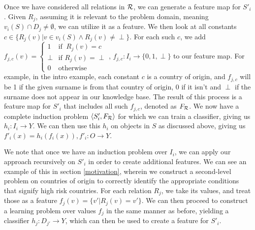 \documentclass[twoside,11pt]{article}
\theoremstyle{definition}
\begin{document}
Once we have considered all relations in ${\cal R}$, we can generate a feature map for $S'_i$. Given $R_j$, assuming it is relevant to the problem domain, meaning $v_i(S)\cap D_j\neq\emptyset$, we can utilize it as a feature. We then look at all constants $c\in \{R_j(v)|v\in v_i(S)\land R_j(v)\neq \perp\}$. For each such $c$, we add  $f_{j,c}(v)=\begin{cases} 1 &\mbox{if } \ R_j(v)=c\\
\perp &\mbox{if } R_j(v)=\perp\\
0 & \mbox{otherwise } \end{cases}$, $f_{j,c}:I_i\rightarrow \{0,1,\perp\}$ to our feature map. 
For example, in the intro example, each constant $c$ is a country of origin, and $f_{j,c}$ will be 1 if the given surname is from that country of origin, 0 if it isn't and $\perp$ if the surname does not appear in our knowledge base.
The result of this process is a feature map for $S'_i$ that includes all such $f_{j,c}$, denoted as $F_{\cal R}$. We now have a complete induction problem $\langle S'_i,F_{\cal R} \rangle$ for which we can train a classifier, giving us $h_i:I_i\rightarrow Y$. We can then use this $h_i$ on objects in $S$ as discussed above, giving us $f'_{i}(x)=h_{i}(f_{i}(x)), f'_{i}:O\rightarrow Y$. 

We note that once we have an induction problem over $I_i$, we can apply our approach recursively on $S'_i$ in order to create additional features. We can see an example of this in section \ref{motivation}, wherein we construct a second-level problem on countries of origin to correctly identify the appropriate conditions that signify high risk countries.
 For each relation $R_j$, we take its values, and treat those as a feature $f_j(v)=\{v'|R_j(v)=v' \}$. We can then proceed to construct a learning problem over values $f_j$ in the same manner as before, yielding a classifier $h_j:D_{j'}\rightarrow Y$, which can then be used to create a feature for $S'_i$. 
 
\end{document}

